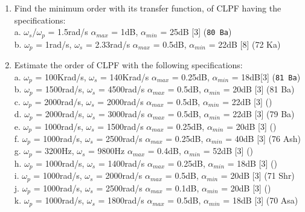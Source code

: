 \documentclass[12pt]{article}
\newcommand{\w}{\(\omega\)}
\begin{document}
\begin{enumerate}
				\item Find the minimum order with its transfer function, of CLPF having the specifications:\\
				a. \w$_s$/\w$_p$ = 1.5rad/s \hspace{5.8cm}
				$\alpha_{max}$ = 1dB, $\alpha_{min}$ = 25dB \hfill [3] (\texttt{80 Ba})\\ 
				b. \w$_p$ = 1rad/s, \w$_s$ = 2.33rad/s \hspace{3.7cm}
				$\alpha_{max}$ = 0.5dB, $\alpha_{min}$ = 22dB \hfill[8] (72 Ka)

				\item Estimate the order of CLPF with the following specifications:\\
				a. \w$_p$ = 100Krad/s, \w$_s$ = 140Krad/s \hspace{2.8cm}
				$\alpha_{max}$ = 0.25dB, $\alpha_{min}$ = 18dB\hfill [3] (\texttt{81 Ba})\\
				b. \w$_p$ = 1500rad/s, \w$_s$ = 4500rad/s \hspace{3cm}
				$\alpha_{max}$ = 0.5dB, $\alpha_{min}$ = 20dB \hfill[3] (81 Ba)\\
				c. \w$_p$ = 2000rad/s, \w$_s$ = 2000rad/s \hspace{30.5mm}
				$\alpha_{max}$ = 0.5dB, $\alpha_{min}$ = 22dB \hfill[3] ()\\
				d. \w$_p$ = 2000rad/s, \w$_s$ = 3000rad/s \hspace{3cm}
				$\alpha_{max}$ = 0.5dB, $\alpha_{min}$ = 22dB \hfill[3] (79 Ba)\\
				e. \w$_p$ = 1000rad/s, \w$_s$ = 1500rad/s \hspace{30.5mm}
				$\alpha_{max}$ = 0.25dB, $\alpha_{min}$ = 20dB \hfill[3] ()\\
				f. \w$_p$ = 1000rad/s, \w$_s$ = 2500rad/s \hspace{3.1cm}
				$\alpha_{max}$ = 0.25dB, $\alpha_{min}$ = 40dB \hfill[3] (76 Ash)\\
				g. \w$_p$ = 3200Hz, \w$_s$ = 9800Hz \hspace{3.95cm}
				$\alpha_{max}$ = 0.4dB, $\alpha_{min}$ = 52dB \hfill[3] ()\\
				h. \w$_p$ = 1000rad/s, \w$_s$ = 1400rad/s \hspace{3cm}
				$\alpha_{max}$ = 0.25dB, $\alpha_{min}$ = 18dB \hfill[3] ()\\
				i. \w$_p$ = 1000rad/s, \w$_s$ = 2000rad/s \hspace{3.1cm}
				$\alpha_{max}$ = 0.5dB, $\alpha_{min}$ = 20dB \hfill[3] (71 Shr)\\
				j. \w$_p$ = 1000rad/s, \w$_s$ = 2500rad/s \hspace{3.1cm}
				$\alpha_{max}$ = 0.1dB, $\alpha_{min}$ = 20dB \hfill[3] ()\\
				k. \w$_p$ = 1000rad/s, \w$_s$ = 1800rad/s \hspace{3cm}
				$\alpha_{max}$ = 0.5dB, $\alpha_{min}$ = 18dB \hfill[3] (70 Asa)


\end{enumerate}
\end{document}
